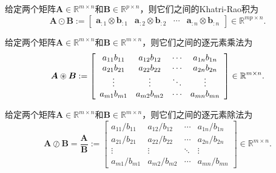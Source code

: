 \begin{definition}\kaishu
	给定两个矩阵$\boldsymbol{A}\in\mathbb{R}^{m\times n}$和$\boldsymbol{B}\in\mathbb{R}^{p\times n}$，则它们之间的Khatri-Rao积为
	\begin{equation*}
		\boldsymbol{A} \odot \boldsymbol{B}:=\left[\begin{array}{cccc}
		\boldsymbol{a}_{:1}\otimes\boldsymbol{b}_{:1} & \boldsymbol{a}_{:2}\otimes\boldsymbol{b}_{:2} & \cdots & \boldsymbol{a}_{:n}\otimes\boldsymbol{b}_{:n}
		\end{array}\right]\in\mathbb{R}^{mp\times n}.
	\end{equation*}
\end{definition}


\begin{definition}[逐元素乘法]\kaishu
	给定两个矩阵$\boldsymbol{A}\in\mathbb{R}^{m\times n}$和$\boldsymbol{B}\in\mathbb{R}^{m\times n}$，则它们之间的逐元素乘法为
	\begin{equation*}
		\boldsymbol{A} \oast \boldsymbol{B}:=\left[\begin{array}{cccc}
			a_{11}b_{11} & a_{12}b_{12} & \cdots & a_{1 n}b_{1 n} \\
			a_{21}b_{21} & a_{22}b_{22} & \cdots & a_{2 n}b_{2 n} \\
			\vdots & \vdots & \ddots & \vdots \\
			a_{m 1}b_{m 1} & a_{m 2}b_{m 2} & \cdots & a_{m n}b_{m n}
		\end{array}\right]\in\mathbb{R}^{m\times n}.
	\end{equation*}
\end{definition}

\begin{definition}[逐元素除法]\kaishu
	给定两个矩阵$\boldsymbol{A}\in\mathbb{R}^{m\times n}$和$\boldsymbol{B}\in\mathbb{R}^{m\times n}$，则它们之间的逐元素除法为
	\begin{equation*}
		\boldsymbol{A} \oslash \boldsymbol{B}=\frac{\boldsymbol{A}}{\boldsymbol{B}}:=\left[\begin{array}{cccc}
		a_{11}/b_{11} & a_{12}/b_{12} & \cdots & a_{1 n}/b_{1 n} \\
		a_{21}/b_{21} & a_{22}/b_{22} & \cdots & a_{2 n}/b_{2 n} \\
		\vdots & \vdots & \ddots & \vdots \\
		a_{m 1}/b_{m 1} & a_{m 2}/b_{m 2} & \cdots & a_{m n}/b_{m n}
		\end{array}\right]\in\mathbb{R}^{m\times n}.
	\end{equation*}
\end{definition}

